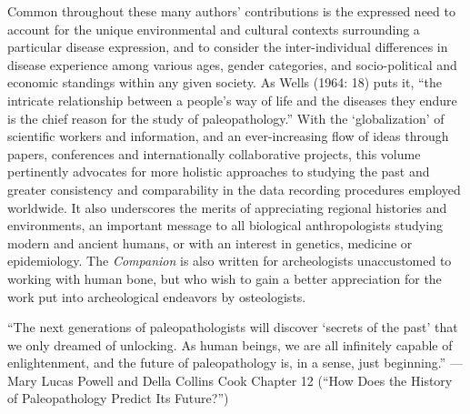 \documentclass{ijsra}
\begin{document}
Common throughout these many authors’ contributions is the expressed need to account for the unique environmental and cultural contexts surrounding a particular disease expression, and to consider the inter-individual differences in disease experience among various ages, gender categories, and socio-political and economic standings within any given society.
As Wells (1964: 18) puts it, “the intricate relationship between a people’s way of life and the diseases they endure is the chief reason for the study of paleopathology.”
With the ‘globalization’ of scientific workers and information, and an ever-increasing flow of ideas through papers, conferences and internationally collaborative projects, this volume pertinently advocates for more holistic approaches to studying the past and greater consistency and comparability in the data recording procedures employed worldwide.
It also underscores the merits of appreciating regional histories and environments, an important message to all biological anthropologists studying modern and ancient humans, or with an interest in genetics, medicine or epidemiology.
The \textit{Companion} is also written for archeologists unaccustomed to working with human bone, but who wish to gain a better appreciation for the work put into archeological endeavors by osteologists.

“The next generations of paleopathologists will discover ‘secrets of the past’ that we only dreamed of unlocking. As human beings, we are all infinitely capable of enlightenment, and the future of paleopathology is, in a sense, just beginning.” 
—Mary Lucas Powell and Della Collins Cook
Chapter 12 (“How Does the History of Paleopathology Predict Its Future?”)
\IJSRAclosing%
\end{document}
